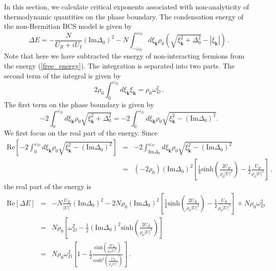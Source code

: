\documentclass[aps,onecolumn,superscriptaddress,notitlepage,longbibliography]{revtex4-1}
\begin{document}
In this section, we calculate critical exponents associated with non-analyticity of thermodynamic quantities on the phase boundary. The condensation energy of the non-Hermitian BCS model is given by \cite{Yamamoto2019}
\begin{equation}
 \Delta E = - \frac{N}{U_R + i U_I} \left( \text{Im} \Delta_0 \right)^2
  - N \int_{- \omega_D}^{\omega_D} d \xi_{\bm{k}} \rho_0 \left( \sqrt{\xi_{\bm{k}}^2 +
  \Delta_0^2} - | \xi_{\bm{k}} | \right)\,.\label{free_energy}
\end{equation}
Note that here we have subtracted the energy of non-interacting fermions from the energy (\ref{free_energy}). The integration is separated into two parts. The second term of the integral is given by
\begin{equation}
  2 \rho_0 \int_0^{\omega_D} d \xi_{\bm{k}} \xi_{\bm{k}} = \rho_0 \omega_D^2\,.
\end{equation}
The first term on the phase boundary is given by
\[ - 2 \int_0^{\omega_D} d \xi_{\bm{k}} \rho_0 \sqrt{\xi_{\bm{k}}^2 + \Delta_0^2} = - 2
   \int_0^{\omega_D} d \xi_{\bm{k}} \rho_0 \sqrt{\xi_{\bm{k}}^2 - \left( \text{Im} \Delta_0
   \right)^2}. \]
We first focus on the real part of the energy. Since
\begin{eqnarray}
  \text{Re}\left[- 2 \int_0^{\omega_D} d \xi_{\bm{k}} \rho_0 \sqrt{\xi_{\bm{k}}^2 - \left( \text{Im}
  \Delta_0 \right)^2}\right] & = & - 2 \int_{\text{Im} \Delta_0}^{\omega_D}
  d \xi_{\bm{k}} \rho_0 \sqrt{\xi_{\bm{k}}^2 - \left( \text{Im} \Delta_0 \right)^2}
  \nonumber\\
  & = & (- 2 \rho_0) \left( \text{Im} \Delta_0 \right)^2 \left[ \frac{1}{4}
  \text{sinh} \left( \frac{2 U_R}{\rho_0 | U |^2} \right) - \frac{1}{2}
  \frac{U_R}{\rho_0 | U |^2} \right]\,,
\end{eqnarray}
the real part of the energy is
\begin{eqnarray}
  \text{Re} [\Delta E] & = & - N \frac{U_R}{| U |^2} \left( \text{Im} \Delta_0
  \right)^2 - 2 N \rho_0 \left( \text{Im} \Delta_0 \right)^2 \left[
  \frac{1}{4} \text{sinh} \left( \frac{2 U_R}{\rho_0 | U |^2} \right) -
  \frac{1}{2} \frac{U_R}{\rho_0 | U |^2} \right] + N \rho_0 \omega_D^2
  \nonumber\\
  & = & N \rho_0 \left[ \omega_D^2 - \frac{1}{2} \left( \text{Im} \Delta_0
  \right)^2 \text{sinh} \left( \frac{2 U_R}{\rho_0 | U |^2} \right) \right]
  \nonumber\\
  & = & N \rho_0 \omega_D^2 \left[ 1 - \frac{1}{2} \frac{\text{sinh} \left(
  \frac{2 U_R}{\rho_0 | U |^2} \right)}{\text{cosh}^2 \left( \frac{U_R}{\rho_0
  | U |^2} \right)} \right]\,.
  \label{free}
\end{eqnarray}
\end{document}
